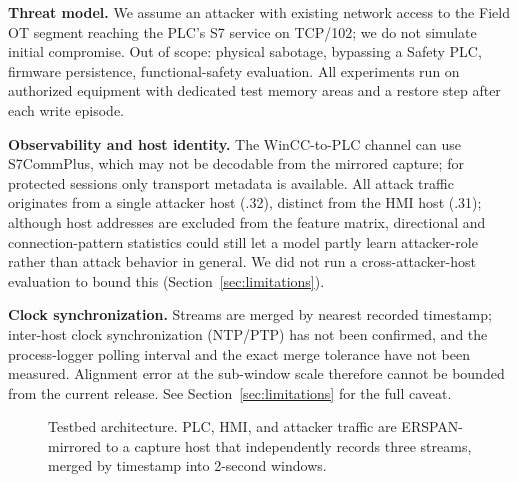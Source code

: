\documentclass[conference]{IEEEtran}
\begin{document}
\textbf{Threat model.} We assume an attacker with existing network access to the Field OT segment reaching
the PLC's S7 service on TCP/102; we do not simulate initial compromise. Out of scope: physical sabotage,
bypassing a Safety PLC, firmware persistence, functional-safety evaluation. All experiments run on
authorized equipment with dedicated test memory areas and a restore step after each write episode.

\textbf{Observability and host identity.} The WinCC-to-PLC channel can use S7CommPlus, which may not be
decodable from the mirrored capture; for protected sessions only transport metadata is available. All
attack traffic originates from a single attacker host (.32), distinct from the HMI host (.31); although
host addresses are excluded from the feature matrix, directional and connection-pattern statistics could
still let a model partly learn attacker-role rather than attack behavior in general. We did not run a
cross-attacker-host evaluation to bound this (Section~\ref{sec:limitations}).

\textbf{Clock synchronization.} Streams are merged by nearest recorded timestamp; inter-host clock
synchronization (NTP/PTP) has not been confirmed, and the process-logger polling interval and the exact
merge tolerance have not been measured. Alignment error at the sub-window scale therefore cannot be
bounded from the current release. See Section~\ref{sec:limitations} for the full caveat.

\begin{figure}[t]
\centering
{}
\caption{Testbed architecture. PLC, HMI, and attacker traffic are ERSPAN-mirrored to a capture
host that independently records three streams, merged by timestamp into 2-second windows.}
\label{fig:testbed}
\end{figure}
\end{document}
